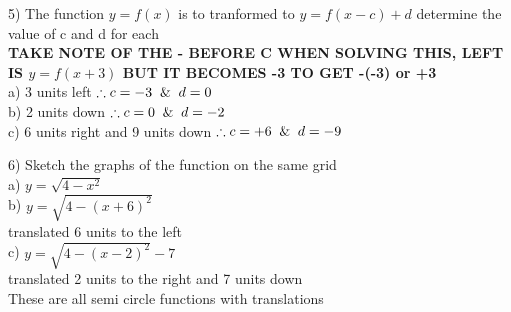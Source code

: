 \documentclass[10pt]{article}
\begin{document}
5) The function \(y = f(x)\) is to tranformed to \(y = f(x - c) + d\) determine the value of c and d for each \\
\hspace*{1em} \textbf{TAKE NOTE OF THE - BEFORE C WHEN SOLVING THIS, LEFT IS \(y = f(x + 3)\) BUT IT BECOMES -3 TO GET -(-3) or +3} \\
\hspace*{1em} a) 3 units left \(\therefore c = -3 \And d = 0\)\\
\hspace*{1em} b) 2 units down \(\therefore c = 0 \And d = -2\) \\
\hspace*{1em} c) 6 units right and 9 units down  \(\therefore c = +6 \And d = -9\)
\clearpage


6) Sketch the graphs of the function on the same grid \\
\hspace*{1em} a) \(y = \sqrt{4-x^2}\) \\
\hspace*{1em} b) \(y = \sqrt{4-(x+6)^2}\) \\
\hspace*{2em} translated 6 units to the left \\
\hspace*{1em} c) \(y = \sqrt{4-(x-2)^2}-7\) \\
\hspace*{2em} translated 2 units to the right and 7 units down \\
\hspace*{1em} These are all semi circle functions with translations


\end{document}
